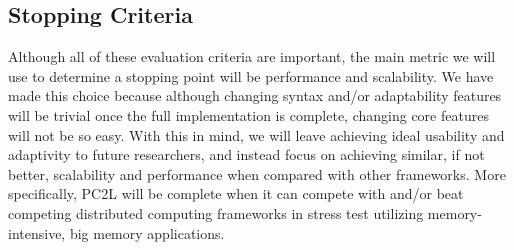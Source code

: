 \subsection{Stopping Criteria}
Although all of these evaluation criteria are important, the main metric we will use to determine a stopping point will be performance and scalability. We have made this choice because although changing syntax and/or adaptability features will be trivial once the full implementation is complete, changing core features will not be so easy. With this in mind, we will leave achieving ideal usability and adaptivity to future researchers, and instead focus on achieving similar, if not better, scalability and performance when compared with other frameworks. More specifically, PC2L will be complete when it can compete with and/or beat competing distributed computing frameworks in stress test utilizing memory-intensive, big memory applications. 


